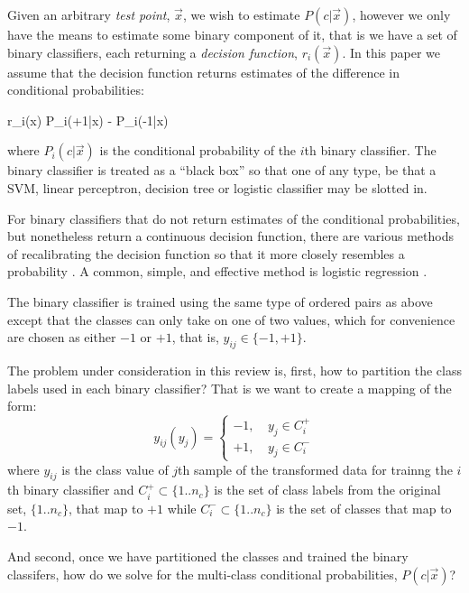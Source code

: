 Given an arbitrary {\it test point}, $\vec x$, 
we wish to estimate $P(c | \vec x)$, however we only have
the means to estimate some binary component of it, that is we have a 
set of binary classifiers, 
each returning a {\it decision function}, $r_i(\vec x)$.
In this paper we assume that the decision function 
returns estimates of the difference in conditional probabilities:
\begin{eqnnon}
	r_i(\vec x) \approx P_i(+1|\vec x) - P_i(-1|\vec x)
\end{eqnnon}
where $P_i(c|\vec x)$ is the conditional probability of the $i$th
binary classifier.
The binary classifier is treated as a ``black box'' so that one of any type,
be that a SVM, linear perceptron, decision tree or logistic classifier may be 
slotted in.

For binary classifiers that do not return estimates of the conditional
probabilities, but nonetheless return a continuous decision function,
there are various methods of recalibrating the decision function
so that it more closely resembles a probability 
\citep{Zadrozny_Elkan2002,Jolliffe_Stephenson2003,Niculescu_Caruana2005}.
A common, simple, and effective method is logistic regression \citep{Platt1999}.

The binary classifier is trained using the same type of ordered pairs as
above except that the classes can only take on one of two values,
which for convenience are chosen as either $-1$ or $+1$, 
that is, $y_{ij} \in \lbrace -1, +1 \rbrace$.

The problem under consideration in this review is, first,
how to partition the class labels used in each binary classifier?
That is we want to create a mapping of the form:
\begin{equation}
	y_{ij} (y_j) = \left \lbrace  \begin{array}{lr}
-1, & ~ y_j \in C_i^+ \\
+1, & ~ y_j \in C_i^-
\end{array}
	\right . \label{mapping}
\end{equation}
where $y_{ij}$ is the class value of $j$th sample of the transformed data 
for trainng the $i$th binary classifier and 
$C_i^+ \subset \lbrace 1..n_c \rbrace$ is the set of class labels from the original set,
$\lbrace 1..n_c \rbrace$, that map to $+1$ while
$C_i^- \subset \lbrace 1..n_c \rbrace$ is the set of classes that map to $-1$.

And second, once we have partitioned the classes
and trained the binary classifers,
how do we solve for the multi-class conditional probabilities, $P(c|\vec x)$?

